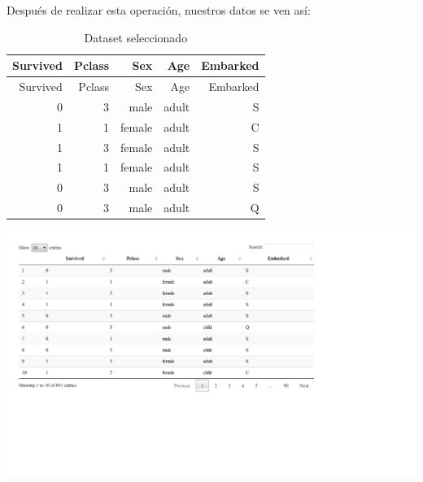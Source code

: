 \documentclass[]{article}
\newenvironment{Shaded}{\begin{snugshade}}{\end{snugshade}}
\newcommand{\KeywordTok}[1]{\textcolor[rgb]{0.13,0.29,0.53}{\textbf{#1}}}
\newcommand{\DecValTok}[1]{\textcolor[rgb]{0.00,0.00,0.81}{#1}}
\newcommand{\StringTok}[1]{\textcolor[rgb]{0.31,0.60,0.02}{#1}}
\newcommand{\OperatorTok}[1]{\textcolor[rgb]{0.81,0.36,0.00}{\textbf{#1}}}
\newcommand{\NormalTok}[1]{#1}
\begin{document}
\begin{Shaded}
\end{Shaded}

Después de realizar esta operación, nuestros datos se ven así:

\begin{longtable}[]{@{}rrrrr@{}}
\caption{Dataset seleccionado}\tabularnewline
\toprule
Survived & Pclass & Sex & Age & Embarked\tabularnewline
\midrule
\endfirsthead
\toprule
Survived & Pclass & Sex & Age & Embarked\tabularnewline
\midrule
\endhead
0 & 3 & male & adult & S\tabularnewline
1 & 1 & female & adult & C\tabularnewline
1 & 3 & female & adult & S\tabularnewline
1 & 1 & female & adult & S\tabularnewline
0 & 3 & male & adult & S\tabularnewline
0 & 3 & male & adult & Q\tabularnewline
\bottomrule
\end{longtable}

\includegraphics{titanicDataClean_files/figure-latex/class_2-1.pdf}
\end{document}
